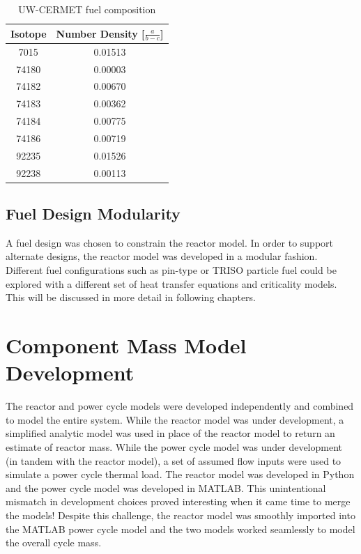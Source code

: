 \begin{table}[h]
  \centering
  \caption{UW-CERMET fuel composition}
  \begin{tabular}{cc}
    \toprule
    Isotope   & Number Density [$\frac{a}{b-c}$] \\
    \midrule
    7015	&	0.01513	\\
    74180	&	0.00003	\\
    74182	&	0.00670	\\
    74183	&	0.00362	\\
    74184	&	0.00775	\\
    74186	&	0.00719	\\
    92235	&	0.01526	\\
    92238	&	0.00113	\\
  \end{tabular}
  \label{tab:uw_comp}
\end{table}

\newpage

\subsection{Fuel Design Modularity}
A fuel design was chosen to constrain the reactor model. In order to support
alternate designs, the reactor model was developed in a modular fashion.
Different fuel configurations such as pin-type or TRISO particle fuel could be
explored with a different set of heat transfer equations and criticality models.
This will be discussed in more detail in following chapters.

\section{Component Mass Model Development}
The reactor and power cycle models were developed independently and combined
to model the entire system. While the reactor model
was under development, a simplified analytic model was used in place of the
reactor model to return an estimate of reactor mass. While the power cycle model
was under development (in tandem with the reactor model), a set of assumed flow
inputs were used to simulate a power cycle thermal load. The reactor model was
developed in Python and the power cycle model was developed in MATLAB. This
unintentional mismatch in development choices proved interesting when it came
time to merge the models! Despite this challenge, the reactor model was smoothly
imported into the MATLAB power cycle model and the two models worked seamlessly
to model the overall cycle mass.
